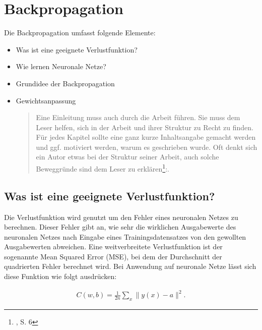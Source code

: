 \newpage
\thispagestyle{empty}
\section{Backpropagation}\label{sec:backpropagation}   

\vspace{1cm}
\begin{tcolorbox}[title={Inhalt}]
Die Backpropagation umfasst folgende Elemente:
\begin{itemize}
\item Was ist eine geeignete Verlustfunktion?
\item Wie lernen Neuronale Netze?
\item Grundidee der Backpropagation
\item Gewichtsanpassung
\begin{quotation}
Eine Einleitung muss auch durch die Arbeit führen. Sie muss dem Leser helfen, sich in der Arbeit und ihrer Struktur zu Recht zu finden. Für jedes Kapitel sollte eine ganz kurze Inhaltsangabe gemacht werden und ggf. motiviert werden, warum es geschrieben wurde. Oft denkt sich ein Autor etwas bei der Struktur seiner Arbeit, auch solche Beweggründe sind dem Leser zu erklären\footnote{\cite{BBoJ}, S. 6}:. 
\end{quotation}
\end{itemize}
\end{tcolorbox}

\subsection{Was ist eine geeignete Verlustfunktion?}\label{subsec:backpropagation:verlustfunktion}
Die Verlustfunktion wird genutzt um den Fehler eines neuronalen Netzes zu berechnen. Dieser Fehler gibt an, 
wie sehr die wirklichen Ausgabewerte des neuronalen Netzes nach Eingabe eines Trainingsdatensatzes von den gewollten Ausgabewerten abweichen. 
\bigbreak\noindent
Eine weitverbreitete Verlustfunktion ist der sogenannte Mean Squared Error (MSE), bei dem der Durchschnitt der quadrierten Fehler berechnet wird.
Bei Anwendung auf neuronale Netze lässt sich diese Funktion wie folgt ausdrücken:

\begin{eqnarray}  
  C(w,b) = \frac{1}{2n} \sum_x \| y(x) - a\|^2.
\end{eqnarray}

